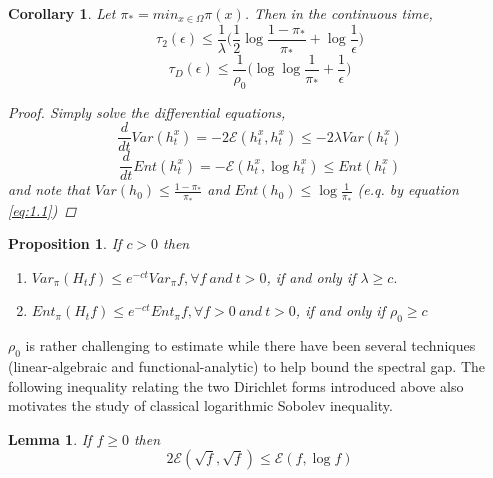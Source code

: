 \documentclass[12pt,reqno]{amsart}
\newtheorem{cor}[thm]{Corollary}
\newtheorem{lem}[thm]{Lemma}
\newtheorem{prop}[thm]{Proposition}
\begin{document}
\begin{cor}
  Let $\pi_* = min_{x\in \Omega}\pi(x)$. Then in the continuous time,
  \begin{equation}
    \tau_2(\epsilon) \leq \frac{1}{\lambda}\big(\frac{1}{2}\log \frac{1-\pi_*}{\pi_*} + \log
    \frac{1}{\epsilon} \big)
  \end{equation}
  \begin{equation}
    \tau_D(\epsilon) \leq \frac{1}{\rho_0}\big(\log \log \frac{1}{\pi_*} + \frac{1}{\epsilon} \big)
  \end{equation}
  \begin{proof}
    Simply solve the differential equations,
    \begin{equation}
      \frac{d}{dt}Var(h_t^x) = -2 \mathcal{E}(h_t^x,h_t^x) \leq -2\lambda Var(h_t^x) 
    \end{equation}
    \begin{equation}
      \frac{d}{dt}Ent(h_t^x) = - \mathcal{E}(h_t^x,\log h_t^x) \leq Ent(h_t^x)
    \end{equation}
and note that $Var(h_0) \leq \frac{1-\pi_*}{\pi_*}$ and $Ent(h_0)\leq \log \frac{1}{\pi_*}$
(e.q. by equation \eqref{eq:1.1})
  \end{proof}
\end{cor}

\begin{prop}
If $c > 0$ then
  \begin{enumerate}
  \item $Var_{\pi}(H_tf)\leq e^{-ct}Var_{\pi}f, \forall f ~and~ t > 0$, if and only if $\lambda\geq c.$
  \item $Ent_{\pi}(H_tf)\leq e^{-ct}Ent_{\pi}f, \forall f>0 ~and~ t > 0$, if and only if $\rho_0 \geq c$
  \end{enumerate}
\end{prop}



$\rho_0$ is rather challenging to estimate while there have been several techniques (linear-algebraic and functional-analytic) to help bound the spectral gap. The following inequality relating the two Dirichlet forms introduced above also motivates the study of classical logarithmic Sobolev inequality. 
\begin{lem}
  If $f\geq 0$ then
  \begin{equation}
    \label{eq:two_forms}
    2\mathcal{E}(\sqrt{f}, \sqrt{f}) \leq \mathcal{E}(f,\log f)
  \end{equation}
\end{lem}
\end{document}
